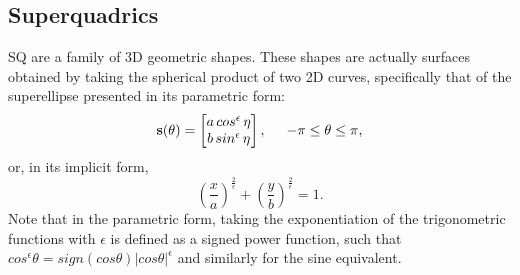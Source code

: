 


\subsection{Superquadrics}

\gls{SQ} are a family of 3D geometric shapes. These shapes are actually surfaces obtained by taking the spherical product of two 2D curves, specifically that of the superellipse presented in its parametric form: 
\begin{equation}
\textbf{s}(\theta) = \begin{bmatrix}
a\,cos^\epsilon\,\eta \\
b\,sin^\epsilon\,\eta
\end{bmatrix}, \hspace{0.5cm}
-\pi \leq \theta \leq \pi,
\label{eq:SuperEllipse}
\end{equation}
or, in its implicit form,
\begin{equation}
\left(\frac{x}{a}\right)^\frac{2}{\epsilon} + \left(\frac{y}{b}\right)^\frac{2}{\epsilon} = 1.
\end{equation}
Note that in the parametric form, taking the exponentiation of the trigonometric functions with $\epsilon$ is defined as a signed power function, such that $cos^\epsilon \theta = sign(cos\theta)|cos\theta|^\epsilon$ and similarly for the sine equivalent.

